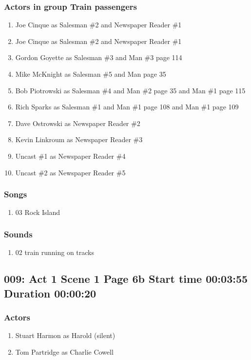 \subsubsection{Actors in group Train passengers}
\begin{enumerate}
\item Joe Cinque as Salesman \#2 and Newspaper Reader \#1
\item Joe Cinque as Salesman \#2 and Newspaper Reader \#1
\item Gordon Goyette as Salesman \#3 and Man \#3 page 114
\item Mike McKnight as Salesman \#5 and Man page 35
\item Bob Piotrowski as Salesman \#4 and Man \#2 page 35 and Man \#1 page 115
\item Rich Sparks as Salesman \#1 and Man \#1 page 108 and Man \#1 page 109
\item Dave Ostrowski as Newspaper Reader \#2
\item Kevin Linkroum as Newspaper Reader \#3
\item Uncast \#1 as Newspaper Reader \#4
\item Uncast \#2 as Newspaper Reader \#5
\end{enumerate}

\subsubsection{Songs}
\begin{enumerate}
\item 03 Rock Island
\end{enumerate}\subsubsection{Sounds}
\begin{enumerate}
\item 02 train running on tracks
\end{enumerate}
\subsection{009: Act 1 Scene 1 Page 6b Start time 00:03:55 Duration 00:00:20}

\subsubsection{Actors}
\begin{enumerate}
\item Stuart Harmon as Harold (silent)
\item Tom Partridge as Charlie Cowell
\end{enumerate}
